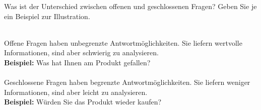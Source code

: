 \begin{exercise}
  Was ist der Unterschied zwischen offenen und geschlossenen Fragen? Geben Sie je ein Beispiel zur Illustration.
  \\\\
\end{exercise}
Offene Fragen haben unbegrenzte Antwortmöglichkeiten. Sie liefern wertvolle Informationen, sind aber schwierig zu analysieren.\\
\textbf{Beispiel:} Was hat Ihnen am Produkt gefallen?\\\\
Geschlossene Fragen haben begrenzte Antwortmöglichkeiten. Sie liefern weniger Informationen, sind aber leicht zu analysieren.\\
\textbf{Beispiel:} Würden Sie das Produkt wieder kaufen?